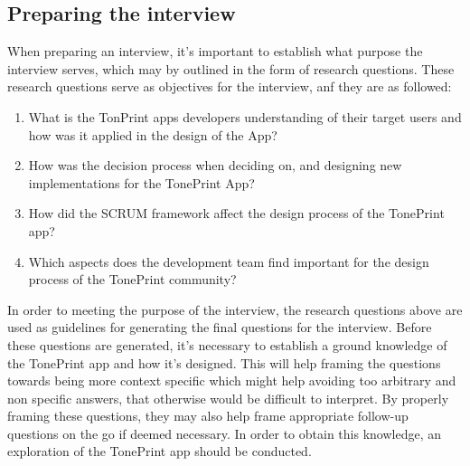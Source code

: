 \subsection{Preparing the interview}
\label{PreparingTheInterview}
When preparing an interview, it's important to establish what purpose the interview serves, which may by outlined in the form of research questions. These research questions serve as objectives for the interview, anf they are as followed:
\begin{enumerate}
	\item What is the TonPrint apps developers understanding of their target users and how was it applied in the design of the App?
	\item How was the decision process when deciding on, and designing new implementations for the TonePrint App?
	\item How did the SCRUM framework affect the design process of the TonePrint app?
	\item Which aspects does the development team find important for the design process of the TonePrint community?
\end{enumerate}

\noindent
In order to meeting the purpose of the interview, the research questions above are used as guidelines for generating the final questions for the interview. Before these questions are generated, it's necessary to establish a ground knowledge of the TonePrint app and how it's designed. This will help framing the questions towards being more context specific which might help avoiding too arbitrary and non specific answers, that otherwise would be difficult to interpret. By properly framing these questions, they may also help frame appropriate follow-up questions on the go if deemed necessary. In order to obtain this knowledge, an exploration of the TonePrint app should be conducted.


